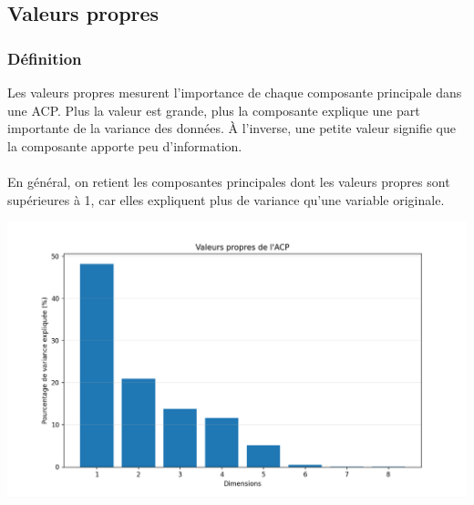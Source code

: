 \documentclass[12pt]{scrartcl}
\begin{document}

        \subsection{Valeurs propres}
            \subsubsection{Définition}
                Les valeurs propres mesurent l’importance de chaque composante principale dans une ACP. Plus la valeur est grande, plus la composante explique une part importante de la variance des données. À l’inverse, une petite valeur signifie que la composante apporte peu d’information.\\\\
                En général, on retient les composantes principales dont les valeurs propres sont supérieures à 1, car elles expliquent plus de variance qu’une variable originale.\\

                \begin{center}
                    \includegraphics[width=1\textwidth]{images/valeurs_propres_ACP.png}
                \end{center}
\end{document}
